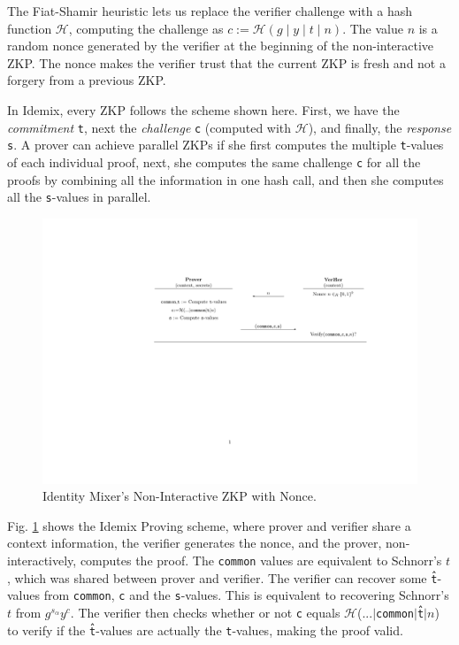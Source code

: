 The Fiat-Shamir heuristic lets us replace the verifier challenge with a hash function $\mathcal{H}$, computing the challenge as $c:=\mathcal{H}(g\mid y\mid t\mid n)$. The value $n$ is a random nonce generated by the verifier at the beginning of the non-interactive ZKP. The nonce makes the verifier trust that the current ZKP is fresh and not a forgery from a previous ZKP.

In Idemix, every ZKP follows the scheme shown here. First, we have the \textit{commitment} \texttt{t}, next the \textit{challenge} \texttt{c} (computed with $\mathcal{H}$), and finally, the \textit{response} \texttt{s}. A prover can achieve parallel ZKPs if she first computes the multiple \texttt{t}-values of each individual proof, next, she computes the same challenge \texttt{c} for all the proofs by combining all the information in one hash call, and then she computes all the \texttt{s}-values in parallel.

\begin{figure}[bth]
	\includegraphics[width=\linewidth]{gfx/niZKPnonce}
	\caption{Identity Mixer's Non-Interactive ZKP with Nonce.}
	\label{fig:niZKPnonce}
\end{figure}

Fig. \ref{fig:niZKPnonce} shows the Idemix Proving scheme, where prover and verifier share a context information, the verifier generates the nonce, and the prover, non-interactively, computes the proof. The \texttt{common} values are equivalent to Schnorr's $t$, which was shared between prover and verifier. The verifier can recover some \texttt{\^t}-values from \texttt{common}, \texttt{c} and the \texttt{s}-values. This is equivalent to recovering Schnorr's $t$ from $g^{s_\alpha} y^c$. The verifier then checks whether or not \texttt{c} equals $\mathcal{H}$(...$\mid$\texttt{common}$\mid$\texttt{\^t}$\mid$$n$) to verify if the \texttt{\^t}-values are actually the \texttt{t}-values, making the proof valid.


